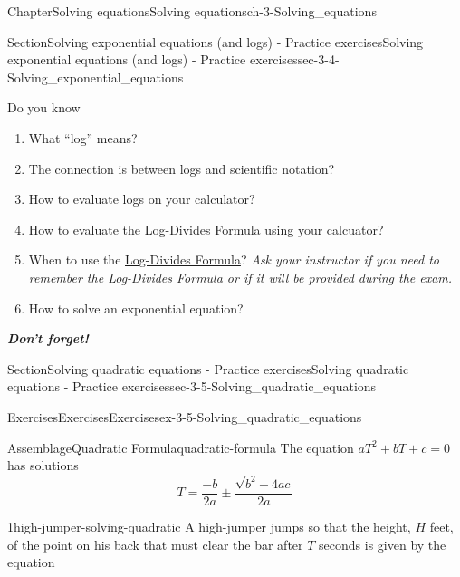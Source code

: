 \documentclass[twoside,11pt,]{book}
\newcommand{\alert}[1]{\textbf{\textit{#1}}}
\numberwithin{equation}{section}
\begin{document}
\begin{chapterptx}{Chapter}{Solving equations}{}{Solving equations}{}{}{ch-3-Solving_equations}
\begin{sectionptx}{Section}{Solving exponential equations (and logs) - Practice exercises}{}{Solving exponential equations (and logs) - Practice exercises}{}{}{sec-3-4-Solving_exponential_equations}
\begin{conclusion}{Do you know \textellipsis{}}
%
\begin{enumerate}[label={\Alph*.}]
\item{}What ``log'' means?%
\item{}The connection is between logs and scientific notation?%
\item{}How to evaluate logs on your calculator?%
\item{}How to evaluate the \hyperref[log-divides-formula]{Log-Divides Formula} using your calcuator?%
\item{}When to use the \hyperref[log-divides-formula]{Log-Divides Formula}? \emph{Ask your instructor if you need to remember the \hyperref[log-divides-formula]{Log-Divides Formula} or if it will be provided during the exam.}%
\item{}How to solve an exponential equation?%
\end{enumerate}
%
\par
\alert{Don't forget!}%
\end{conclusion}%
\end{sectionptx}
%
%
\typeout{************************************************}
\typeout{************************************************}
%
\begin{sectionptx}{Section}{Solving quadratic equations - Practice exercises}{}{Solving quadratic equations - Practice exercises}{}{}{sec-3-5-Solving_quadratic_equations}
%
%
\typeout{************************************************}
\typeout{************************************************}
%
\begin{exercises-subsection-numberless}{Exercises}{Exercises}{}{Exercises}{}{}{ex-3-5-Solving_quadratic_equations}
\begin{introduction}{}%
\begin{assemblage}{Assemblage}{Quadratic Formula}{quadratic-formula}%
The equation \(aT^2+bT+c=0\) has solutions%
\begin{equation*}
T = \frac{-b}{2a} \pm \frac{\sqrt{b^2-4ac}}{2a}
\end{equation*}
%
\end{assemblage}
\end{introduction}%
\begin{divisionexercise}{1}{}{}{high-jumper-solving-quadratic}%
A high-jumper jumps so that the height, \(H\) feet, of the point on his back that must clear the bar after \(T\) seconds is given by the equation%
\begin{equation*}

\end{equation*}
\end{divisionexercise}
\end{exercises-subsection-numberless}
\end{sectionptx}
\end{chapterptx}
\end{document}
